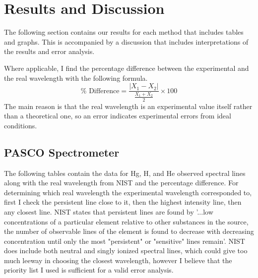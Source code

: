 \documentclass[12pt]{article}
\begin{document}
\clearpage

	\section{Results and Discussion}

	The following section contains our results for each method that includes tables and graphs. This is accompanied by a discussion that includes interpretations of the results and error analysis.
	
	Where applicable, I find the percentage difference between the experimental and the real wavelength with the following formula.
	\[
		\% \text{ Difference} = \frac{\left| X_1 - X_2 \right|}{\frac{X_1 + X_2}{2}} \times 100
	\]
	The main reason is that the real wavelength is an experimental value itself rather than a theoretical one, so an error indicates experimental errors from ideal conditions.
	
	\subsection{PASCO Spectrometer}
	
	
	The following tables contain the data for Hg, H, and He observed spectral lines along with the real wavelength from NIST and the percentage difference. For determining which real wavelength the experimental wavelength corresponded to, first I check the persistent line close to it, then the highest intensity line, then any closest line. NIST states that persistent lines are found by '...low concentrations of a particular element relative to other substances in the source, the number of observable lines of the element is found to decrease with decreasing concentration until only the most "persistent" or "sensitive" lines remain'. NIST does include both neutral and singly ionized spectral lines, which could give too much leeway in choosing the closest wavelength, however I believe that the priority list I used is sufficient for a valid error analysis.
\end{document}
